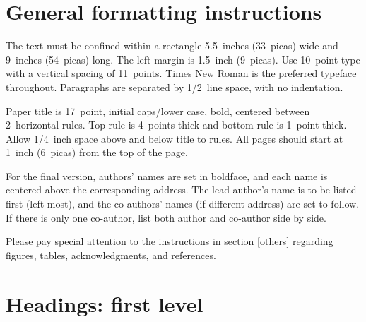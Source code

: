 \documentclass{article} %
\begin{document}


\section{General formatting instructions}
\label{gen_inst}

The text must be confined within a rectangle 5.5~inches (33~picas) wide and
9~inches (54~picas) long. The left margin is 1.5~inch (9~picas).
Use 10~point type with a vertical spacing of 11~points. Times New Roman is the
preferred typeface throughout. Paragraphs are separated by 1/2~line space,
with no indentation.

Paper title is 17~point, initial caps/lower case, bold, centered between
2~horizontal rules. Top rule is 4~points thick and bottom rule is 1~point
thick. Allow 1/4~inch space above and below title to rules. All pages should
start at 1~inch (6~picas) from the top of the page.


For the final version, authors' names are
set in boldface, and each name is centered above the corresponding
address. The lead author's name is to be listed first (left-most), and
the co-authors' names (if different address) are set to follow. If
there is only one co-author, list both author and co-author side by side.

Please pay special attention to the instructions in section \ref{others}
regarding figures, tables, acknowledgments, and references.

\section{Headings: first level}
\label{headings}
\end{document}
